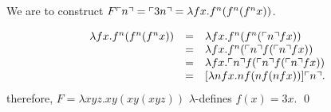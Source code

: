 \begin{pf} \rm
 We are to construct $F \ulcorner{n}\urcorner = \ulcorner{3n}\urcorner = \lambda fx. f^n (f^n (f^n x))$.

\[
 \begin{array}{rcl}
  \lambda fx. f^n (f^n (f^n x)) & = & \lambda fx. f^n (f^n (\ulcorner{n}\urcorner f x)) \\
  & = & \lambda fx. f^n (\ulcorner{n}\urcorner f (\ulcorner{n}\urcorner f x)) \\
  & = & \lambda fx. \ulcorner{n}\urcorner f (\ulcorner{n}\urcorner f (\ulcorner{n}\urcorner f x)) \\
  & = & [\lambda nfx. nf (nf (nfx))] \ulcorner{n}\urcorner.
 \end{array}
\]
therefore, $F = \lambda xyz. xy(xy(xyz))$ $\lambda$-defines $f(x)=3x$.
\qed
\end{pf}
